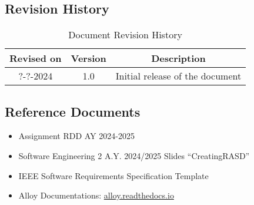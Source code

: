 \subsection{Revision History}
\begin{table}[h]
    \centering
    \begin{tabular}{|c|c|c|}
        \hline
        \textbf{Revised on} & \textbf{Version} & \textbf{Description}\\ \hline
        ?-?-2024 & 1.0     & Initial release of the document \\ \hline
    \end{tabular}
    \caption{Document Revision History}
    \label{tab:revision_history_table}
\end{table}

\subsection{Reference Documents}
\begin{itemize}
  \item Assignment RDD AY 2024-2025
  \item Software Engineering 2 A.Y. 2024/2025 Slides “CreatingRASD”
  \item IEEE Software Requirements Specification Template
  \item Alloy Documentations: \url{alloy.readthedocs.io}
\end{itemize}


